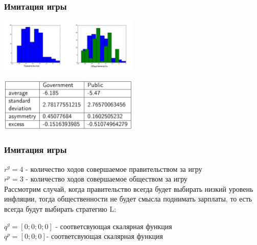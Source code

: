 \documentclass {beamer}
\begin{document}
\begin{frame}
	\frametitle{Имитация игры}
	 \begin{center}
	 	\includegraphics[width=0.50\textwidth]{Government1}
	 \end{center}
 \begin{center}
 	\includegraphics[width=0.50\textwidth]{third}
 \end{center}

\end{frame}

\begin{frame}
	\frametitle{Имитация игры}
	$r^g= 4 $ - количество ходов совершаемое  правительством за игру\\
	$r^p= 3 $ - количество ходов совершаемое  обществом за игру\\
	Рассмотрим случай, когда правительство всегда будет выбирать низкий уровень инфляции, тогда общественности не будет смысла поднимать зарплаты, то есть всегда будут выбирать стратегию L:
	
	$q^g =[ 0; 0; 0; 0 ]$ - соответсвующая скалярная функция \\
	$q^p=[ 0; 0; 0] $- соответсвующая скалярная функция \\
	
	
\end{frame}
\end{document}
